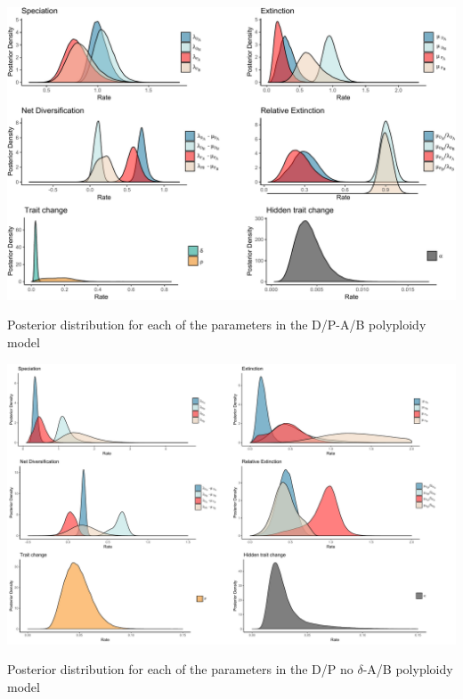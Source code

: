 \begin{suppfigure}
\includegraphics[width=\textwidth]{hisseDPposteriordist.pdf}
\caption{Posterior distribution for each of the parameters in the D/P-A/B polyploidy model} %
\label{suppfigure:DPAB}
\end{suppfigure}

\begin{suppfigure}
\includegraphics[width=\textwidth]{hisseDPnodipposteriordist.pdf}
\caption{Posterior distribution for each of the parameters in the D/P no $\delta$-A/B polyploidy model} %
\label{suppfigure:DPnodipAB}
\end{suppfigure}

